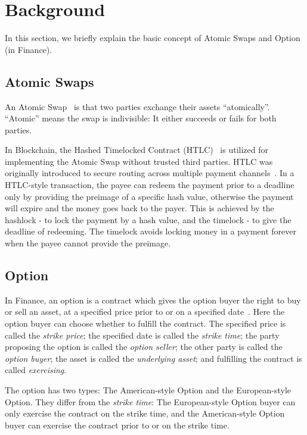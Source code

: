 \section{Background}
\label{sec:background}

In this section, we briefly explain the basic concept of Atomic Swaps and Option (in Finance).

\subsection{Atomic Swaps}

An Atomic Swap~\cite{nolan2013alt} is that two parties exchange their assets ``atomically''.
``Atomic'' means the swap is indivisible: It either succeeds or fails for both parties.

In Blockchain, the Hashed Timelocked Contract (HTLC)~\cite{poon2016bitcoin} is utilized for implementing the Atomic Swap without trusted third parties.
HTLC was originally introduced to secure routing across multiple payment channels~\cite{paychannel2018btcwiki}.
In a HTLC-style transaction, the payee can redeem the payment prior to a deadline only by providing the preimage of a specific hash value, otherwise the payment will expire and the money goes back to the payer.
This is achieved by the hashlock - to lock the payment by a hash value, and the timelock - to give the deadline of redeeming.
The timelock avoids locking money in a payment forever when the payee cannot provide the preimage.

\subsection{Option}
\label{subsec:background_option}

In Finance, an option is a contract which gives the option buyer the right to buy or sell an asset, at a specified price prior to or on a specified date~\cite{higham2004introduction}.
Here the option buyer can choose whether to fulfill the contract.
The specified price is called the \textit{strike price};
the specified date is called the \textit{strike time};
the party proposing the option is called the \textit{option seller};
the other party is called the \textit{option buyer};
the asset is called the \textit{underlying asset};
and fulfilling the contract is called \textit{exercising}.

The option has two types: The American-style Option and the European-style Option.
They differ from the \textit{strike time}:
The European-style Option buyer can only exercise the contract on the strike time,
and the American-style Option buyer can exercise the contract prior to or on the strike time.

